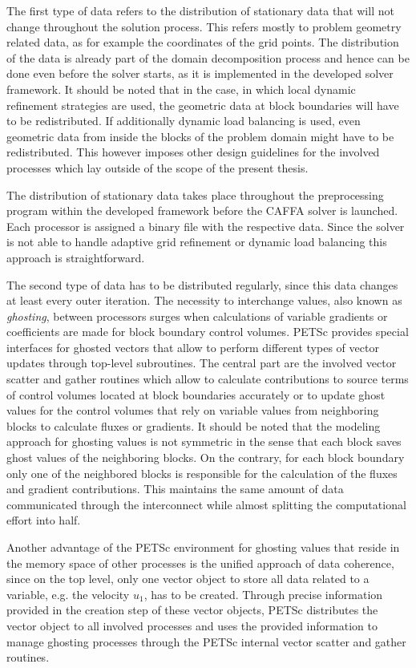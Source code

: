 The first type of data refers to the distribution of stationary data that will not change throughout the solution process. This refers mostly to problem geometry related data, as for example the coordinates of the grid points. The distribution of the data is already part of the domain decomposition process and hence can be done even before the solver starts, as it is implemented in the developed solver framework. It should be noted that in the case, in which local dynamic refinement strategies are used, the geometric data at block boundaries will have to be redistributed. If additionally dynamic load balancing is used, even geometric data from inside the blocks of the problem domain might have to be redistributed. This however imposes other design guidelines for the involved processes which lay outside of the scope of the present thesis.

The distribution of stationary data takes place throughout the preprocessing program within the developed framework before the CAFFA solver is launched. Each processor is assigned a binary file with the respective data. Since the solver is not able to handle adaptive grid refinement or dynamic load balancing this approach is straightforward.

The second type of data has to be distributed regularly, since this data changes at least every outer iteration. The necessity to interchange values, also known as \emph{ghosting}, between processors surges when calculations of variable gradients or coefficients are made for block boundary control volumes. PETSc provides special interfaces for ghosted vectors that allow to perform different types of vector updates through top-level subroutines. The central part are the involved vector scatter and gather routines which allow to calculate contributions to source terms of control volumes located at block boundaries accurately or to update ghost values for the control volumes that rely on variable values from neighboring blocks to calculate fluxes or gradients. It should be noted that the modeling approach for ghosting values is not symmetric in the sense that each block saves ghost values of the neighboring blocks. On the contrary, for each block boundary only one of the neighbored blocks is responsible for the calculation of the fluxes and gradient contributions. This maintains the same amount of data communicated through the interconnect while almost splitting the computational effort into half.

Another advantage of the PETSc environment for ghosting values that reside in the memory space of other processes is the unified approach of data coherence, since on the top level, only one vector object to store all data related to a variable, e.g. the velocity \(u_1\), has to be created. Through precise information provided in the creation step of these vector objects, PETSc distributes the vector object to all involved processes and uses the provided information to manage ghosting processes through the PETSc internal vector scatter and gather routines. 

